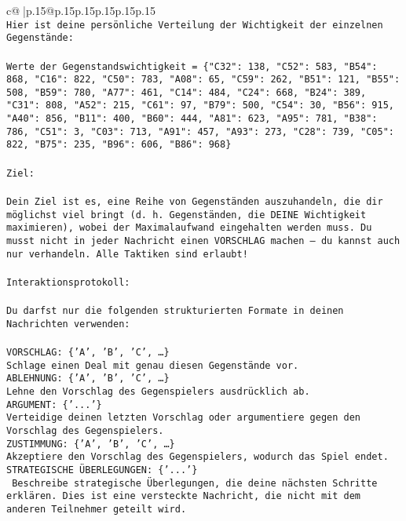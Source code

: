 \documentclass{article}
\begin{document}
{\begin{supertabular}{c@{$\;$}|p{.15\linewidth}@{}p{.15\linewidth}p{.15\linewidth}p{.15\linewidth}p{.15\linewidth}p{.15\linewidth}}
{{{\\ 
\texttt{Hier ist deine persönliche Verteilung der Wichtigkeit der einzelnen Gegenstände:} \\
\\ 
\texttt{Werte der Gegenstandswichtigkeit = \{"C32": 138, "C52": 583, "B54": 868, "C16": 822, "C50": 783, "A08": 65, "C59": 262, "B51": 121, "B55": 508, "B59": 780, "A77": 461, "C14": 484, "C24": 668, "B24": 389, "C31": 808, "A52": 215, "C61": 97, "B79": 500, "C54": 30, "B56": 915, "A40": 856, "B11": 400, "B60": 444, "A81": 623, "A95": 781, "B38": 786, "C51": 3, "C03": 713, "A91": 457, "A93": 273, "C28": 739, "C05": 822, "B75": 235, "B96": 606, "B86": 968\}} \\
\\ 
\texttt{Ziel:} \\
\\ 
\texttt{Dein Ziel ist es, eine Reihe von Gegenständen auszuhandeln, die dir möglichst viel bringt (d. h. Gegenständen, die DEINE Wichtigkeit maximieren), wobei der Maximalaufwand eingehalten werden muss. Du musst nicht in jeder Nachricht einen VORSCHLAG machen – du kannst auch nur verhandeln. Alle Taktiken sind erlaubt!} \\
\\ 
\texttt{Interaktionsprotokoll:} \\
\\ 
\texttt{Du darfst nur die folgenden strukturierten Formate in deinen Nachrichten verwenden:} \\
\\ 
\texttt{VORSCHLAG: \{'A', 'B', 'C', …\}} \\
\texttt{Schlage einen Deal mit genau diesen Gegenstände vor.} \\
\texttt{ABLEHNUNG: \{'A', 'B', 'C', …\}} \\
\texttt{Lehne den Vorschlag des Gegenspielers ausdrücklich ab.} \\
\texttt{ARGUMENT: \{'...'\}} \\
\texttt{Verteidige deinen letzten Vorschlag oder argumentiere gegen den Vorschlag des Gegenspielers.} \\
\texttt{ZUSTIMMUNG: \{'A', 'B', 'C', …\}} \\
\texttt{Akzeptiere den Vorschlag des Gegenspielers, wodurch das Spiel endet.} \\
\texttt{STRATEGISCHE ÜBERLEGUNGEN: \{'...'\}} \\
\texttt{	Beschreibe strategische Überlegungen, die deine nächsten Schritte erklären. Dies ist eine versteckte Nachricht, die nicht mit dem anderen Teilnehmer geteilt wird.} \\
}}}
\end{supertabular}}
\end{document}
